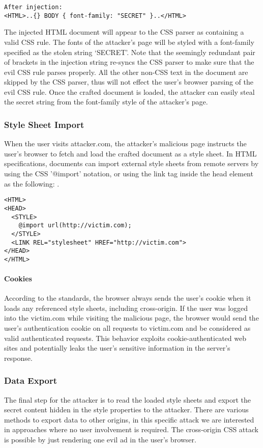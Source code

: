 \documentclass{acm_proc_article-sp}
\begin{document}
{\begin{verbatim}
After injection:
<HTML>..{} BODY { font-family: "SECRET" }..</HTML>
\end{verbatim}
The injected HTML document will appear to the CSS parser as containing a valid CSS rule. The fonts of the attacker's page will be styled with a font-family specified as the stolen string `SECRET'. Note that the seemingly redundant pair of brackets in the injection string re-syncs the CSS parser to make sure that the evil CSS rule parses properly. All the other non-CSS text in the document are skipped by the CSS parser, thus will not effect the user's browser parsing of the evil CSS rule. Once the crafted document is loaded, the attacker can easily steal the secret string from the font-family style of the attacker's page.

\subsubsection{Style Sheet Import}
When the user visits attacker.com, the attacker's malicious page instructs the user's browser to fetch and load the crafted document as a style sheet. In HTML specifications\cite{html}, documents can import external style sheets from remote servers by using the CSS '@import' notation, or using the link tag inside the head element as the following: .
\begin{verbatim}
<HTML>
<HEAD>
  <STYLE>
    @import url(http://victim.com);
  </STYLE>
  <LINK REL="stylesheet" HREF="http://victim.com">
</HEAD>
</HTML>
\end{verbatim}
\paragraph{Cookies}
According to the standards, the browser always sends the user's cookie when it loads any referenced style sheets, including cross-origin. If the user was logged into the victim.com while visiting the malicious page, the browser would send the user's authentication cookie on all requests to victim.com and be considered as valid authenticated requests. This behavior exploits cookie-authenticated web sites and potentially leaks the user's sensitive information in the server's response. 

\subsubsection{Data Export}
The final step for the attacker is to read the loaded style sheets and export the secret content hidden in the style properties to the attacker. There are various methods to export data to other origins, in this specific attack we are interested in approaches where no user involvement is required. The cross-origin CSS attack is possible by just rendering one evil ad in the user's browser. 

}
\end{document}
